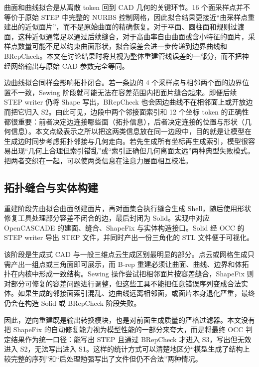 曲面和曲线拟合是从离散 token 回到 CAD 几何的关键环节。16 个面采样点并不等价于原始 STEP 中完整的 NURBS 控制网格，因此拟合结果更接近“由采样点重建出的近似面片”，而不是原始曲面的精确恢复。对于平面、圆柱面和规则过渡面，这种近似通常足以通过后续缝合，对于高曲率自由曲面或含小特征的面片，采样点数量可能不足以约束曲面形状，拟合误差会进一步传递到边界曲线和 BRepCheck。本文在讨论结果时将其视为整体重建管线误差的一部分，而不把神经网络输出与原始 CAD 参数完全等同。

边曲线拟合同样会影响拓扑闭合。若一条边的 4 个采样点与相邻两个面的边界位置不一致，Sewing 阶段就可能无法在容差范围内把面片缝合起来。即便后续 STEP writer 仍将 Shape 写出，BRepCheck 也会因边曲线不在相邻面上或开放边而把它归入 S2。由此可见，边段中两个邻接面索引和 12 个坐标 token 的正确性都很重要：前者决定边连接哪些面（拓扑信息），后者决定连接的位置与形状（几何信息）。本文点级表示之所以把这两类信息放在同一边段中，目的就是让模型在生成边时同步考虑拓扑邻接与几何走向。若先生成所有坐标再生成索引，模型很容易出现“几何上合理但索引错乱”或“索引正确但几何离面太远”两种典型失败模式。把两者交织在一起，可以使两类信息在注意力层面相互校准。

\subsection{拓扑缝合与实体构建}

\begin{sloppypar}
重建阶段先由拟合曲面创建面片，再对面集合执行缝合生成 Shell，随后使用形状修复工具处理部分容差不闭合的边，最后封闭为 Solid。实现中对应 OpenCASCADE 的建面、缝合、ShapeFix 与实体构造接口。Solid 经 OCC 的 STEP writer 导出 STEP 文件，并同时产出一份三角化的 STL 文件便于可视化。
\end{sloppypar}

该阶段是生成式 CAD 与一般三维点云生成区别最明显的部分。点云或网格生成只需产出一组点或三角面即可展示，而 B-rep 重建必须让曲面、曲线、边界和体拓扑在内核中形成一致结构。Sewing 操作尝试把相邻面片按容差缝合，ShapeFix 则对部分可修复的容差问题进行调整，但这些工具不能把任意错误序列变成合法实体。如果生成的邻接面索引混乱、边曲线远离相邻面，或面片本身退化严重，最终仍会在构造 Solid 或 BRepCheck 阶段失败。

因此，逆向重建既是输出转换模块，也是对前面生成质量的严格过滤器。本文没有把 ShapeFix 的自动修复能力视为模型性能的一部分来夸大，而是将最终 OCC 判定结果作为统一口径：能写出 STEP 且通过 BRepCheck 才进入 S3，写出但无效进入 S2，无法写出进入 S1。这样的统计方式可以清楚地区分“模型生成了结构上较完整的序列”和“后处理勉强写出了文件但仍不合法”两种情况。

